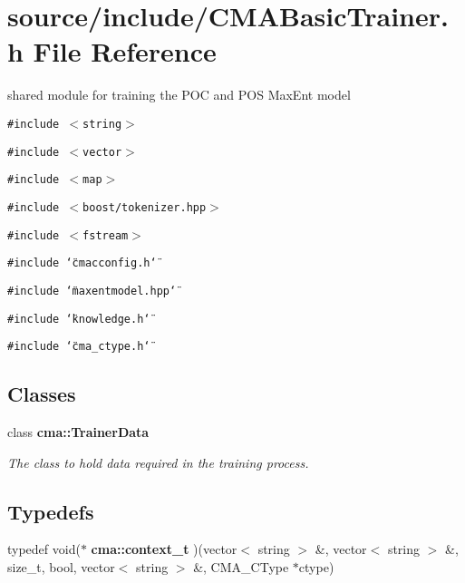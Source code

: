 \section{source/include/CMABasicTrainer.h File Reference}
\label{CMABasicTrainer_8h}
shared module for training the POC and POS MaxEnt model  


{\tt \#include $<$string$>$}\par
{\tt \#include $<$vector$>$}\par
{\tt \#include $<$map$>$}\par
{\tt \#include $<$boost/tokenizer.hpp$>$}\par
{\tt \#include $<$fstream$>$}\par
{\tt \#include \char`\"{}cmacconfig.h\char`\"{}}\par
{\tt \#include \char`\"{}maxentmodel.hpp\char`\"{}}\par
{\tt \#include \char`\"{}knowledge.h\char`\"{}}\par
{\tt \#include \char`\"{}cma\_\-ctype.h\char`\"{}}\par
\subsection*{Classes}
\begin{CompactItemize}
\item 
class {\bf cma::TrainerData}
\begin{CompactList}\small\item\em The class to hold data required in the training process. \item\end{CompactList}\end{CompactItemize}
\subsection*{Typedefs}
\begin{CompactItemize}
\item 
typedef void($\ast$ {\bf cma::context\_\-t} )(vector$<$ string $>$ \&, vector$<$ string $>$ \&, size\_\-t, bool, vector$<$ string $>$ \&, CMA\_\-CType $\ast$ctype)
\end{CompactItemize}
